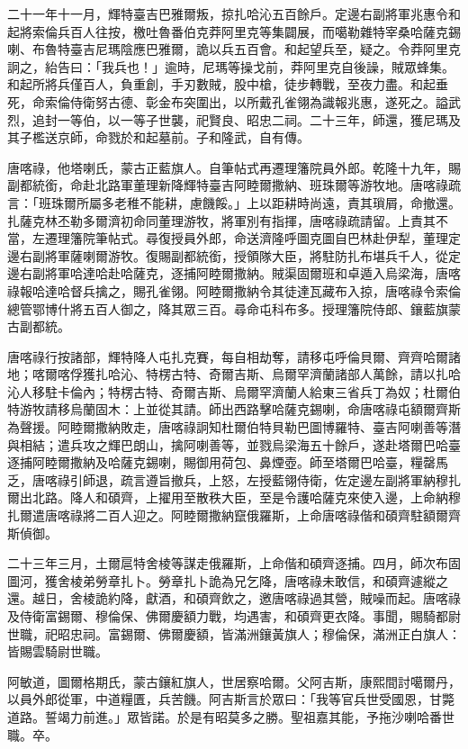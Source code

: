 \begin{pinyinscope}
二十一年十一月，輝特臺吉巴雅爾叛，掠扎哈沁五百餘戶。定邊右副將軍兆惠令和起將索倫兵百人往按，檄吐魯番伯克莽阿里克等集闢展，而噶勒雜特宰桑哈薩克錫喇、布魯特臺吉尼瑪陰應巴雅爾，詭以兵五百會。和起望兵至，疑之。令莽阿里克詗之，紿告曰：「我兵也！」逾時，尼瑪等操戈前，莽阿里克自後譟，賊眾蜂集。和起所將兵僅百人，負重創，手刃數賊，股中槍，徒步轉戰，至夜力盡。和起垂死，命索倫侍衛努古德、彰金布突圍出，以所戴孔雀翎為識報兆惠，遂死之。謚武烈，追封一等伯，以一等子世襲，祀賢良、昭忠二祠。二十三年，師還，獲尼瑪及其子檻送京師，命戮於和起墓前。子和隆武，自有傳。

唐喀祿，他塔喇氏，蒙古正藍旗人。自筆帖式再遷理籓院員外郎。乾隆十九年，賜副都統銜，命赴北路軍董理新降輝特臺吉阿睦爾撒納、班珠爾等游牧地。唐喀祿疏言：「班珠爾所屬多老稚不能耕，慮饑餒。」上以距耕時尚遠，責其瑣屑，命撤還。扎薩克林丕勒多爾濟初命同董理游牧，將軍別有指揮，唐喀祿疏請留。上責其不當，左遷理籓院筆帖式。尋復授員外郎，命送濟隆呼圖克圖自巴林赴伊犁，董理定邊右副將軍薩喇爾游牧。復賜副都統銜，授領隊大臣，將駐防扎布堪兵千人，從定邊右副將軍哈達哈赴哈薩克，逐捕阿睦爾撒納。賊渠固爾班和卓遁入烏梁海，唐喀祿報哈達哈督兵擒之，賜孔雀翎。阿睦爾撒納令其徒達瓦藏布入掠，唐喀祿令索倫總管鄂博什將五百人御之，降其眾三百。尋命屯科布多。授理籓院侍郎、鑲藍旗蒙古副都統。

唐喀祿行按諸部，輝特降人屯扎克賽，每自相劫奪，請移屯呼倫貝爾、齊齊哈爾諸地；喀爾喀俘獲扎哈沁、特楞古特、奇爾吉斯、烏爾罕濟蘭諸部人萬餘，請以扎哈沁人移駐卡倫內；特楞古特、奇爾吉斯、烏爾罕濟蘭人給東三省兵丁為奴；杜爾伯特游牧請移烏蘭固木：上並從其請。師出西路擊哈薩克錫喇，命唐喀祿屯額爾齊斯為聲援。阿睦爾撒納敗走，唐喀祿詗知杜爾伯特貝勒巴圖博羅特、臺吉阿喇善等潛與相結；遣兵攻之輝巴朗山，擒阿喇善等，並戮烏梁海五十餘戶，遂赴塔爾巴哈臺逐捕阿睦爾撒納及哈薩克錫喇，賜御用荷包、鼻煙壺。師至塔爾巴哈臺，糧罄馬乏，唐喀祿引師退，疏言遵旨撤兵，上怒，左授藍翎侍衛，佐定邊左副將軍納穆扎爾出北路。降人和碩齊，上擢用至散秩大臣，至是令護哈薩克來使入邊，上命納穆扎爾遣唐喀祿將二百人迎之。阿睦爾撒納竄俄羅斯，上命唐喀祿偕和碩齊駐額爾齊斯偵御。

二十三年三月，土爾扈特舍棱等謀走俄羅斯，上命偕和碩齊逐捕。四月，師次布固圖河，獲舍棱弟勞章扎卜。勞章扎卜詭為兄乞降，唐喀祿未敢信，和碩齊遽縱之還。越日，舍棱詭約降，獻酒，和碩齊飲之，邀唐喀祿過其營，賊噪而起。唐喀祿及侍衛富錫爾、穆倫保、佛爾慶額力戰，均遇害，和碩齊更衣降。事聞，賜騎都尉世職，祀昭忠祠。富錫爾、佛爾慶額，皆滿洲鑲黃旗人；穆倫保，滿洲正白旗人：皆賜雲騎尉世職。

阿敏道，圖爾格期氏，蒙古鑲紅旗人，世居察哈爾。父阿吉斯，康熙間討噶爾丹，以員外郎從軍，中道糧匱，兵苦饑。阿吉斯言於眾曰：「我等官兵世受國恩，甘斃道路。誓竭力前進。」眾皆諾。於是有昭莫多之勝。聖祖嘉其能，予拖沙喇哈番世職。卒。


\end{pinyinscope}
